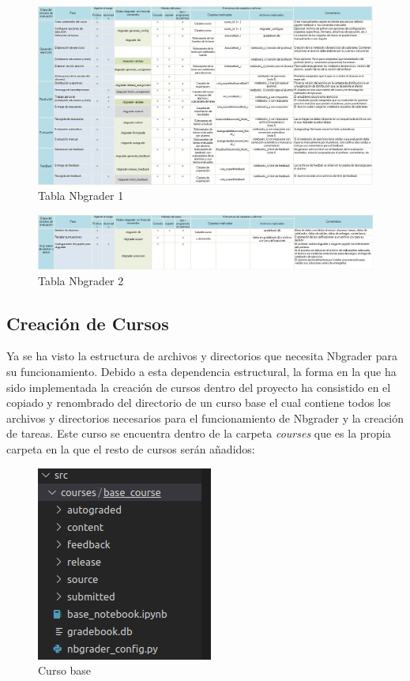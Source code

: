 \begin{landscape}
\begin{figure}[t]
    \hspace*{-2cm} 
    \includegraphics[scale=0.83]{img/imgs-memoria/Tabla_Nbgrader1.PNG}
    \caption{Tabla Nbgrader 1}
\end{figure}

\begin{figure}[t]
    \hspace*{-3cm} 
    \includegraphics[scale=0.78]{img/imgs-memoria/Tabla_Nbgrader2.PNG}
    \caption{Tabla Nbgrader 2}
\end{figure}
\end{landscape}

\subsection{Creación de Cursos}
Ya se ha visto la estructura de archivos y directorios que necesita Nbgrader para su funcionamiento. Debido a esta dependencia estructural, la forma en la que ha sido implementada la creación de cursos dentro del proyecto ha consistido en el copiado y renombrado del directorio de un curso base el cual contiene todos los archivos y directorios necesarios para el funcionamiento de Nbgrader y la creación de tareas. Este curso se encuentra dentro de la carpeta \textit{courses} que es la propia carpeta en la que el resto de cursos serán añadidos:

\begin{figure}[H]
    \centering
    \includegraphics[scale=1]{img/imgs-memoria/base_course.PNG}
    \caption{Curso base}
\end{figure}

